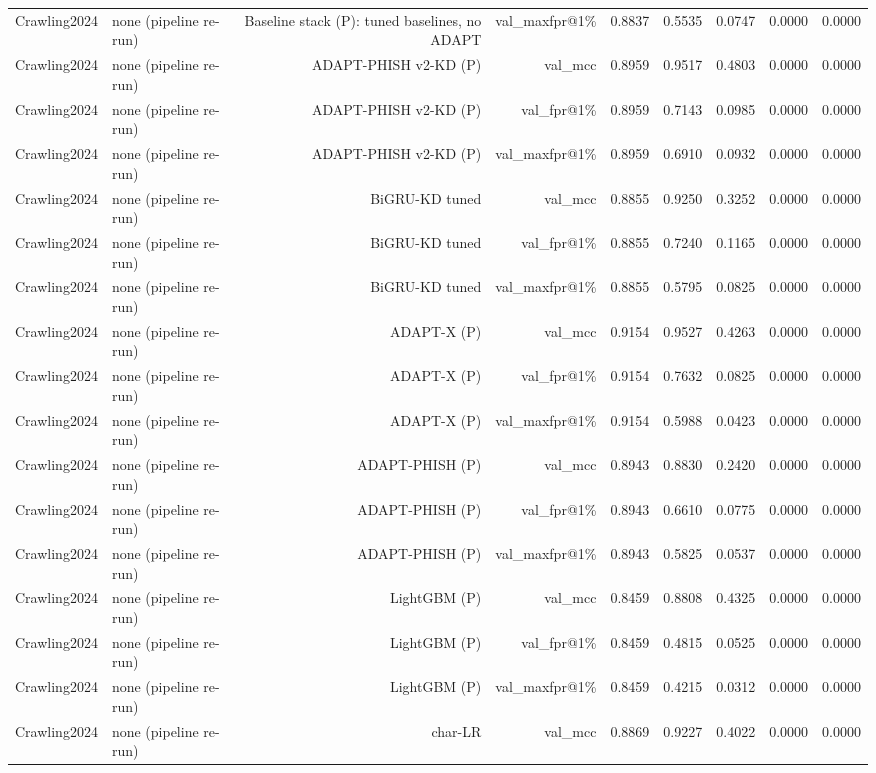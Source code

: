 \begin{table}[t]
\begin{tabular}{llrrrrrrr}
Crawling2024 & none (pipeline re-run) & Baseline stack (P): tuned baselines, no ADAPT & val\_maxfpr@1\% & 0.8837 & 0.5535 & 0.0747 & 0.0000 & 0.0000 \\
Crawling2024 & none (pipeline re-run) & ADAPT-PHISH v2-KD (P) & val\_mcc & 0.8959 & 0.9517 & 0.4803 & 0.0000 & 0.0000 \\
Crawling2024 & none (pipeline re-run) & ADAPT-PHISH v2-KD (P) & val\_fpr@1\% & 0.8959 & 0.7143 & 0.0985 & 0.0000 & 0.0000 \\
Crawling2024 & none (pipeline re-run) & ADAPT-PHISH v2-KD (P) & val\_maxfpr@1\% & 0.8959 & 0.6910 & 0.0932 & 0.0000 & 0.0000 \\
Crawling2024 & none (pipeline re-run) & BiGRU-KD tuned & val\_mcc & 0.8855 & 0.9250 & 0.3252 & 0.0000 & 0.0000 \\
Crawling2024 & none (pipeline re-run) & BiGRU-KD tuned & val\_fpr@1\% & 0.8855 & 0.7240 & 0.1165 & 0.0000 & 0.0000 \\
Crawling2024 & none (pipeline re-run) & BiGRU-KD tuned & val\_maxfpr@1\% & 0.8855 & 0.5795 & 0.0825 & 0.0000 & 0.0000 \\
Crawling2024 & none (pipeline re-run) & ADAPT-X (P) & val\_mcc & 0.9154 & 0.9527 & 0.4263 & 0.0000 & 0.0000 \\
Crawling2024 & none (pipeline re-run) & ADAPT-X (P) & val\_fpr@1\% & 0.9154 & 0.7632 & 0.0825 & 0.0000 & 0.0000 \\
Crawling2024 & none (pipeline re-run) & ADAPT-X (P) & val\_maxfpr@1\% & 0.9154 & 0.5988 & 0.0423 & 0.0000 & 0.0000 \\
Crawling2024 & none (pipeline re-run) & ADAPT-PHISH (P) & val\_mcc & 0.8943 & 0.8830 & 0.2420 & 0.0000 & 0.0000 \\
Crawling2024 & none (pipeline re-run) & ADAPT-PHISH (P) & val\_fpr@1\% & 0.8943 & 0.6610 & 0.0775 & 0.0000 & 0.0000 \\
Crawling2024 & none (pipeline re-run) & ADAPT-PHISH (P) & val\_maxfpr@1\% & 0.8943 & 0.5825 & 0.0537 & 0.0000 & 0.0000 \\
Crawling2024 & none (pipeline re-run) & LightGBM (P) & val\_mcc & 0.8459 & 0.8808 & 0.4325 & 0.0000 & 0.0000 \\
Crawling2024 & none (pipeline re-run) & LightGBM (P) & val\_fpr@1\% & 0.8459 & 0.4815 & 0.0525 & 0.0000 & 0.0000 \\
Crawling2024 & none (pipeline re-run) & LightGBM (P) & val\_maxfpr@1\% & 0.8459 & 0.4215 & 0.0312 & 0.0000 & 0.0000 \\
Crawling2024 & none (pipeline re-run) & char-LR & val\_mcc & 0.8869 & 0.9227 & 0.4022 & 0.0000 & 0.0000 \\

\end{tabular}
\end{table}
